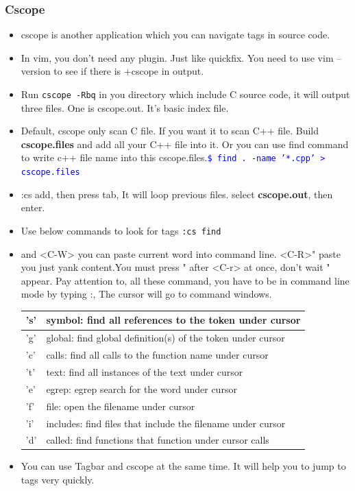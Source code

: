 \documentclass[a4paper,12pt,twoside]{book}
\newcommand{\linuxcommand}[1]{\texttt{\textcolor{blue}{\$ #1 \Pisymbol{psy}{191}}}}
\begin{document}
\subsubsection{Cscope}
\begin{itemize}

\item cscope is another application which you can navigate tags in source code. 
\item In vim, you don't need any plugin. Just like quickfix. You need to use vim --version to see if there is +cscope in output. 

\item Run \verb=cscope -Rbq= in you directory which include C source code, it will output three files. One is cscope.out. It's basic index file. 

\item Default, cscope only scan C file. If you want it to scan C++ file. Build \textbf{cscope.files} and add all your C++ file into it. Or you can use find command to write c++ file name into this cscope.files.\linuxcommand{find . -name '*.cpp' > cscope.files}

\item :cs add, then press tab, It will loop previous files. select \textbf{cscope.out}, then enter.

\item Use below commands to look for tags \verb=:cs find= 
		
\item <C-R> and <C-W> you can paste current word into command line. <C-R>" paste you just yank content.You must press " after <C-r> at once, don't wait " appear. Pay attention to, all these command, you have to be in command line mode by typing :, The cursor will go to command windows. 
  
\begin{tabular}{p{}|p{}}
\hline 
's'  & symbol: find all references to the token under cursor \\
\hline 
'g'  & global: find global definition(s) of the token under cursor \\
\hline 
'c'  & calls:  find all calls to the function name under cursor \\
\hline 
't'  & text:   find all instances of the text under cursor \\
\hline 
'e'  & egrep:  egrep search for the word under cursor \\
\hline 
'f'  & file:   open the filename under cursor \\
\hline 
'i'  & includes: find files that include the filename under cursor \\
\hline 
'd' &  called: find functions that function under cursor calls \\
\hline
\end{tabular}
\item You can use Tagbar and cscope at the same time. It will help you to jump to tags very quickly. 	


\end{itemize}
\end{document}
